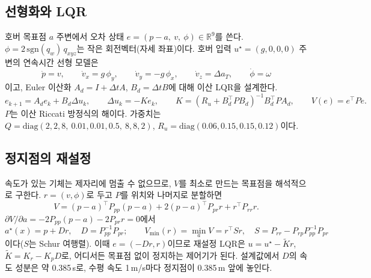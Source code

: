 \documentclass[10pt,a4paper]{article}
\newcommand{\R}{\mathbb{R}}
\newcommand{\ustar}{u^{\star}}
\begin{document}
\subsection{선형화와 LQR}
호버 목표점 $a$ 주변에서 오차 상태 $e=(p-a,\ v,\ \phi)\in\R^9$를 쓴다. $\phi=2\,\mathrm{sgn}(q_w)\,q_{xyz}$는 작은 회전벡터(자세 좌표)이다.
호버 입력 $\ustar=(g,0,0,0)$ 주변의 연속시간 선형 모델은
\begin{equation}
\dot p=v,\qquad \dot v_x=g\,\phi_y,\qquad \dot v_y=-g\,\phi_x,\qquad \dot v_z=\Delta a_T,\qquad \dot\phi=\omega
\end{equation}
이고, Euler 이산화 $A_d=I+\Delta tA$, $B_d=\Delta tB$에 대해 이산 LQR을 설계한다.
\begin{equation}
e_{k+1}=A_de_k+B_d\Delta u_k,\qquad \Delta u_k=-Ke_k,\qquad K=(R_u+B_d^\top PB_d)^{-1}B_d^\top PA_d,\qquad V(e)=e^\top Pe.
\label{eq:lqr}
\end{equation}
$P$는 이산 Riccati 방정식의 해이다. 가중치는 $Q=\mathrm{diag}(2,2,8,\ 0.01,0.01,0.5,\ 8,8,2)$, $R_u=\mathrm{diag}(0.06,0.15,0.15,0.12)$이다.

\subsection{정지점의 재설정}
속도가 있는 기체는 제자리에 멈출 수 없으므로, $V$를 최소로 만드는 목표점을 해석적으로 구한다.
$r=(v,\phi)$로 두고 $P$를 위치와 나머지로 분할하면
\begin{equation}
V=(p-a)^\top P_{pp}(p-a)+2(p-a)^\top P_{pr}r+r^\top P_{rr}r .
\end{equation}
$\partial V/\partial a=-2P_{pp}(p-a)-2P_{pr}r=0$에서
\begin{equation}
a^\star(x)=p+Dr,\quad D=P_{pp}^{-1}P_{pr};\qquad
V_{\min}(r)=\min_aV=r^\top Sr,\quad S=P_{rr}-P_{rp}P_{pp}^{-1}P_{pr}
\label{eq:anchor}
\end{equation}
이다($S$는 Schur 여행렬). 이때 $e=(-Dr,r)$이므로 재설정 LQR은 $u=\ustar-\tilde Kr$, $\tilde K=K_r-K_pD$로, 어디서든 목표점 없이 정지하는 제어기가 된다.
설계값에서 $D$의 속도 성분은 약 0.385\,s로, 수평 속도 1\,m/s마다 정지점이 0.385\,m 앞에 놓인다.
\end{document}
